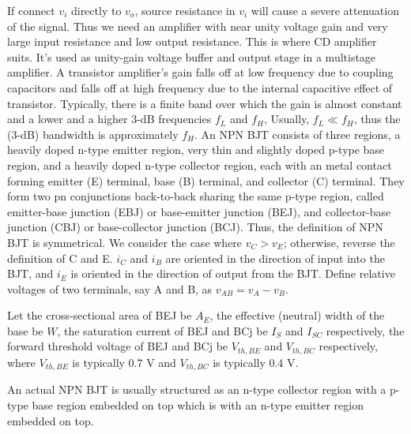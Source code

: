 \documentclass[a4paper,12pt]{report}
\begin{document}
If connect $v_i$ directly to $v_o$, source resistance in $v_i$ will cause a severe attenuation of the signal. Thus we need an amplifier with near unity voltage gain and very large input resistance and low output resistance. This is where CD amplifier suits. It's used as unity-gain voltage buffer and output stage in a multistage amplifier.
A transistor amplifier's gain falls off at low frequency due to coupling capacitors and falls off at high frequency due to the internal capacitive effect of transistor. Typically, there is a finite band over which the gain is almost constant and a lower and a higher 3-dB frequencies $f_L$ and $f_H$, Usually, $f_L\ll f_H$, thus the (3-dB) bandwidth is approximately $f_H$.
An NPN BJT consists of three regions, a heavily doped n-type emitter region, very thin and slightly doped p-type base region, and a heavily doped n-type collector region, each with an metal contact forming emitter (E) terminal, base (B) terminal, and collector (C) terminal. They form two pn conjunctions back-to-back sharing the same p-type region, called emitter-base junction (EBJ) or base-emitter junction (BEJ), and collector-base junction (CBJ) or base-collector junction (BCJ). Thus, the definition of NPN BJT is symmetrical. We consider the case where $v_C>v_E$; otherwise, reverse the definition of C and E. $i_C$ and $i_B$ are oriented in the direction of input into the BJT, and $i_E$ is oriented in the direction of output from the BJT. Define relative voltages of two terminals, say A and B, as $v_{AB}=v_A-v_B$.

Let the cross-sectional area of BEJ be $A_E$, the effective (neutral) width of the base be $W$, the saturation current of BEJ and BCj be $I_S$ and $I_{SC}$ respectively, the forward threshold voltage of BEJ and BCj be $V_{th,BE}$ and $V_{th,BC}$ respectively, where $V_{th,BE}$ is typically 0.7 V and $V_{th,BC}$ is typically 0.4 V.

An actual NPN BJT is usually structured as an n-type collector region with a p-type base region embedded on top which is with an n-type emitter region embedded on top.
\end{document}
